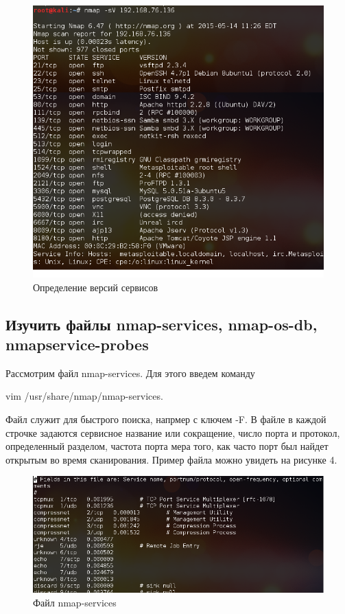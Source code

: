 \documentclass[11pt, a4paper]{article}		%
\begin{document}
\begin{figure}[h!]
\centering
\includegraphics[scale=0.75]{res/services_versions}
\caption{Определение версий сервисов}
\end{figure}


\subsection{Изучить файлы nmap-services, nmap-os-db, nmapservice-probes}

Рассмотрим файл nmap-services. Для этого введем команду 

vim /usr/share/nmap/nmap-services. 

Файл служит для быстрого поиска, напрмер с ключем -F. В файле в каждой строчке задаются сервисное название или сокращение, число порта и протокол, определенный разделом, частота порта мера того, как часто порт был найдет открытым во время сканирования. Пример файла можно увидеть на рисунке 4.


\begin{figure}[h!]
\centering
\includegraphics[scale=0.75]{res/nmap_services}
\caption{Файл nmap-services}
\end{figure}
\end{document}
